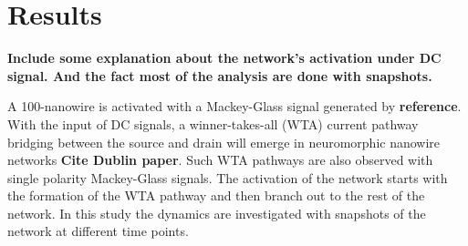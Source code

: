 \documentclass[fleqn,10pt,  amsmath,amssymb,aps]{wlscirep}
\begin{document}
\clearpage
\section*{Results}

\textbf{Include some explanation about the network's activation under DC signal. And the fact most of the analysis are done with snapshots.}


A 100-nanowire is activated with a Mackey-Glass signal generated by \textbf{reference}. With the input of DC signals, a winner-takes-all (WTA) current pathway bridging between the source and drain will emerge in neuromorphic nanowire networks \textbf{Cite Dublin paper}. Such WTA pathways are also observed with single polarity Mackey-Glass signals. The activation of the network starts with the formation of the WTA pathway and then branch out to the rest of the network. In this study the dynamics are investigated with snapshots of the network at different time points.


\end{document}

